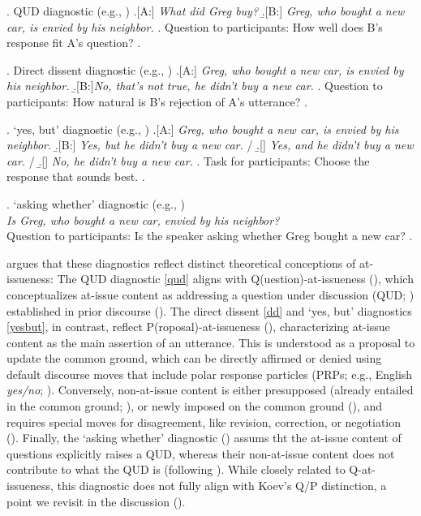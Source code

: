 \documentclass[times,linguex,xcolor]{glossa}
\begin{document}
  \ex. \label{qud}%
    QUD diagnostic (e.g., \citealt{tonhauser_diagnosing_2012,chen_presuppositions_2024})
    \a.[A:] \emph{What did Greg buy?}
    \b.[B:] \emph{Greg, who bought a new car, is envied by his neighbor.}
    \z.
    Question to participants: How well does B's response fit A's question?
  \z.

  \ex. \label{dd} Direct dissent diagnostic (e.g., \citealt{tonhauser_diagnosing_2012,syrett_experimental_2015})
    \a.[A:] \emph{Greg, who bought a new car, is envied by his neighbor.}
    \b.[B:]\emph{No, that's not true, he didn't buy a new car.}
    \z.
  Question to participants: How natural is B's rejection of A's utterance?
  \z.

  \ex. \label{yesbut}%
    `yes, but' diagnostic (e.g., \citealt{xue_correlation_2011,destruel_cross-linguistic_2015})
    \a.[A:] \emph{Greg, who bought a new car, is envied by his neighbor.}
    \b.[B:] \emph{Yes, but he didn't buy a new car.} /
    \b.[] \emph{Yes, and he didn't buy a new car.} /
    \b.[] \emph{No, he didn't buy a new car.}
    \z.
    Task for participants: Choose the response that sounds best.
  \z.

  \ex. \label{aw}%
    `asking whether' diagnostic (e.g., \citealt{tonhauser_how_2018,solstad_cataphoric_2024})\smallskip\\
      \emph{Is Greg, who bought a new car, envied by his neighbor?}\smallskip
  \\ Question to participants: Is the speaker asking whether Greg bought a new car?
  \z.

  \citealt{koev_notions_2018} argues that these diagnostics reflect distinct theoretical conceptions of at-issueness: The QUD diagnostic \ref{qud} aligns with Q(uestion)-at-issueness (\citealt{simons_what_2010}), which conceptualizes at-issue content as addressing a question under discussion (QUD; \citealt{roberts_information_1996,ginzburg_interrogatives_1996}) established in prior discourse (\citealt{amaral_review_2007}).
  The direct dissent \ref{dd} and `yes, but' diagnostics \ref{yesbut}, in contrast, reflect P(roposal)-at-issueness (\citealt{koev_apposition_2013}), characterizing at-issue content as the main assertion of an utterance. This is understood as a proposal to update the common ground, which can be directly affirmed or denied using default discourse moves that include polar response particles (PRPs; e.g., English \emph{yes/no}; \citealt{farkas_reacting_2010}). Conversely, non-at-issue content is either presupposed (already entailed in the common ground; \citealt{stalnaker_presuppositions_1973,stalnaker_common_2002}), or newly imposed on the common ground (\citealt{murray_varieties_2014,anderbois_at-issue_2015}), and requires special moves for disagreement, like revision, correction, or negotiation (\citealt{potts_logic_2005}).
  Finally, the `asking whether' diagnostic (\citealt{tonhauser_how_2018}) assums tht the at-issue content of questions explicitly raises a QUD, whereas their non-at-issue content does not contribute to what the QUD is (following \citealt{roberts_information_1996}). While closely related to Q-at-issueness, this diagnostic does not fully align with Koev’s Q/P distinction, a point we revisit in the discussion ().
\end{document}
